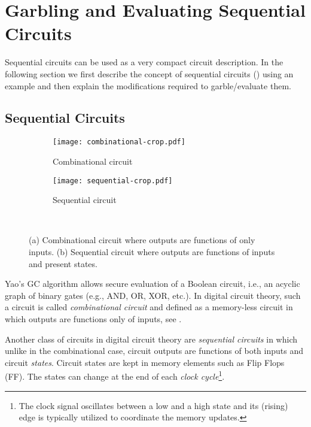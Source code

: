 \chapter{Garbling and Evaluating Sequential Circuits}\label{chap:sequen}
Sequential circuits can be used as a very compact circuit description.
In the following section we first describe the concept of sequential circuits () using an example and then explain the modifications required to garble/evaluate them.

\section{Sequential Circuits}\label{sec:sqcirc}

\begin{figure}[ht]
    \centering
    \begin{subfigure}[t]{0.35\textwidth}
        \texttt{[image: combinational-crop.pdf]}
        \caption{Combinational circuit}\label{fig:combinational}
    \end{subfigure}
    \begin{subfigure}[t]{0.30\textwidth}
        \texttt{[image: sequential-crop.pdf]}
        \caption{Sequential circuit}\label{fig:sequential}
    \end{subfigure}\\
\vspace{10pt}
    \caption{(a) Combinational circuit where outputs are functions of only inputs.
(b) Sequential circuit where outputs are functions of inputs and present states.}
\end{figure}

Yao's GC algorithm allows secure evaluation of a Boolean circuit, i.e., an acyclic graph of binary gates (e.g., AND, OR, XOR, etc.).
In digital circuit theory, such a circuit is called \emph{combinational circuit} and defined as a memory-less circuit in which outputs are functions only of inputs, see .

Another class of circuits in digital circuit theory are \emph{sequential circuits} in which unlike in the combinational case, circuit outputs are functions of both inputs and circuit \emph{states}.
Circuit states are kept in memory elements such as Flip Flops (FF).
The states can change at the end of each \emph{clock cycle}\footnote{The clock signal oscillates between a low and a high state and its (rising) edge is typically utilized to coordinate the memory updates.}.

